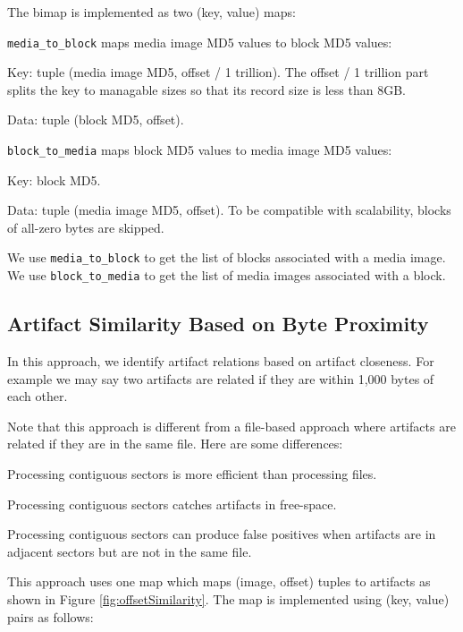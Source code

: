 \documentclass[12pt,twoside]{article}
\begin{document}
The bimap is implemented as two (key, value) maps:
\begin{compactitem}
\item \verb+media_to_block+ maps media image MD5 values to block MD5 values:
  \begin{compactitem}
  \item Key: tuple (media image MD5, offset / 1 trillion). The offset / 1 trillion part splits the key to managable sizes so that its record size is less than 8GB.
  \item Data: tuple (block MD5, offset).
  \end{compactitem}
\item \verb+block_to_media+ maps block MD5 values to media image MD5 values:
  \begin{compactitem}
  \item Key: block MD5.
  \item Data: tuple (media image MD5, offset). To be compatible with scalability, blocks of all-zero bytes are skipped.
  \end{compactitem}
\end{compactitem}

We use \verb+media_to_block+ to get the list of blocks associated with a media image.
We use \verb+block_to_media+ to get the list of media images associated with a block.


\subsection{Artifact Similarity Based on Byte Proximity}
In this approach, we identify artifact relations based on artifact closeness. For example we may say two artifacts are related if they are within 1,000 bytes of each other.

Note that this approach is different from a file-based approach where artifacts are related if they are in the same file. Here are some differences:

\begin{compactitem}
\item Processing contiguous sectors is more efficient than processing files.
\item Processing contiguous sectors catches artifacts in free-space.
\item Processing contiguous sectors can produce false positives when artifacts are in adjacent sectors but are not in the same file.
\end{compactitem}

This approach uses one map which maps (image, offset) tuples to artifacts as shown in Figure \ref{fig:offsetSimilarity}. The map is implemented using (key, value) pairs as follows:
\end{document}
